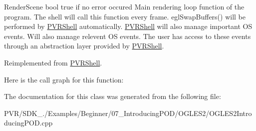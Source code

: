   Render\+Scene  bool true if no error occured  Main rendering loop function of the program. The shell will call this function every frame. egl\+Swap\+Buffers() will be performed by \hyperlink{class_p_v_r_shell}{P\+V\+R\+Shell} automatically. \hyperlink{class_p_v_r_shell}{P\+V\+R\+Shell} will also manage important O\+S events. Will also manage relevent O\+S events. The user has access to these events through an abstraction layer provided by \hyperlink{class_p_v_r_shell}{P\+V\+R\+Shell}. 

Reimplemented from \hyperlink{class_p_v_r_shell_ae0eb5f797cbe993a22b8659f9c332578}{P\+V\+R\+Shell}.



Here is the call graph for this function\+:




The documentation for this class was generated from the following file\+:\begin{DoxyCompactItemize}
\item 
P\+V\+R/\+S\+D\+K\+\_./\+Examples/\+Beginner/07\+\_\+\+Introducing\+P\+O\+D/\+O\+G\+L\+E\+S2/O\+G\+L\+E\+S2\+Introducing\+P\+O\+D.\+cpp\end{DoxyCompactItemize}
